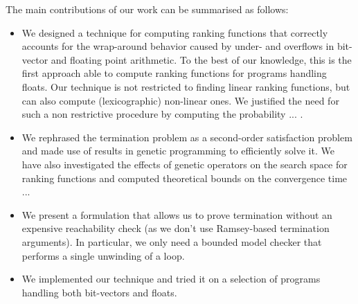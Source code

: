 \documentclass[preprint]{sigplanconf}
\theoremstyle{definition}
\begin{document}


 The main contributions of our work can be summarised as follows:
\begin{itemize}
\item We designed a technique for computing ranking functions that correctly accounts for the wrap-around behavior caused by under- and overflows in bit-vector and floating point arithmetic. To the best of our knowledge, this is the first approach able to compute ranking functions for programs handling floats. Our technique is not restricted to finding linear ranking functions, but can also compute (lexicographic) non-linear  ones. We justified the need for such a non restrictive procedure by computing the probability ... .
\item  We rephrased the termination problem as a second-order satisfaction problem and made 
use of results in genetic programming to efficiently solve it. We have also investigated the effects of genetic operators on the search space for ranking functions and computed theoretical 
bounds on the convergence time ...
\item We present a formulation that allows us to prove termination without an expensive reachability check (as we don't use Ramsey-based termination arguments).  In particular,
we only need a bounded model checker that performs a single unwinding of a loop.
\item We implemented our technique and tried it on a selection of programs handling both bit-vectors and floats.
\end{itemize}


\end{document}
